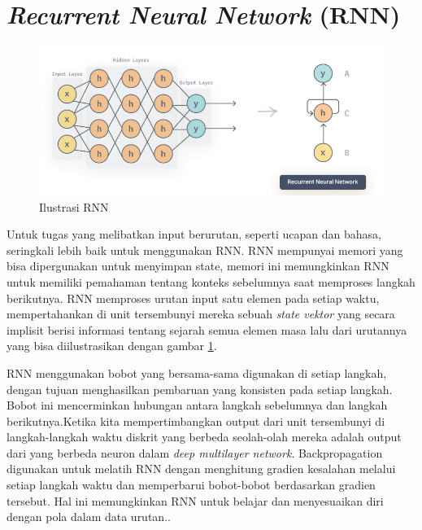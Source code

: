 \section{\emph{Recurrent Neural Network} (RNN)}

\begin{figure} [H] \centering
  \includegraphics[scale=0.55]{gambar/rnn.png}
  \caption{Ilustrasi RNN \parencite{18}}
  \label{fig:rnn}
\end{figure}

Untuk tugas yang melibatkan input berurutan, seperti ucapan dan bahasa, seringkali lebih baik untuk menggunakan RNN.
RNN mempunyai memori yang bisa dipergunakan untuk menyimpan state, memori ini memungkinkan RNN untuk memiliki pemahaman
tentang konteks sebelumnya saat memproses langkah berikutnya. RNN memproses urutan input satu elemen pada setiap waktu,
mempertahankan di unit tersembunyi mereka sebuah \emph{state vektor} yang secara implisit berisi informasi tentang sejarah semua
elemen masa lalu dari urutannya yang bisa diilustrasikan dengan gambar \ref{fig:rnn}.

RNN menggunakan bobot yang bersama-sama digunakan di setiap langkah, dengan tujuan menghasilkan pembaruan yang konsisten
pada setiap langkah. Bobot ini mencerminkan hubungan antara langkah sebelumnya dan langkah berikutnya.Ketika kita
mempertimbangkan output dari unit tersembunyi di langkah-langkah waktu diskrit yang berbeda seolah-olah mereka adalah output
dari yang berbeda neuron dalam \emph{deep multilayer network}. Backpropagation digunakan untuk melatih RNN dengan menghitung gradien
kesalahan melalui setiap langkah waktu dan memperbarui bobot-bobot berdasarkan gradien tersebut. Hal ini memungkinkan RNN untuk
belajar dan menyesuaikan diri dengan pola dalam data urutan.\parencite{18}.

\newpage

